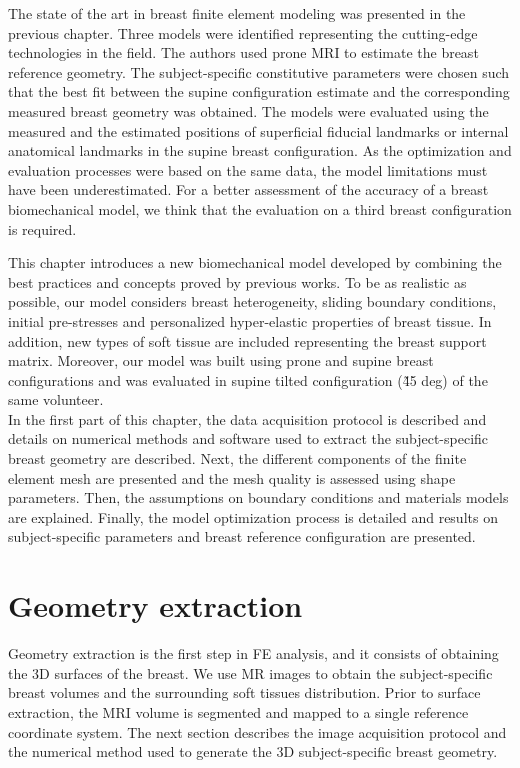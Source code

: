 
The state of the art in breast finite element modeling was presented in the previous chapter. Three models were identified representing the cutting-edge technologies in the field. The authors used prone MRI to estimate the breast reference geometry. The subject-specific constitutive parameters were chosen such that the best fit between the supine configuration estimate and the corresponding measured breast geometry was obtained. The models were evaluated using the measured and the estimated positions of superficial fiducial landmarks or internal anatomical landmarks in the supine breast configuration. As the optimization and evaluation  processes were based on the same data, the model limitations must have been underestimated. For a better assessment of the accuracy of a breast biomechanical model, we think that the evaluation on a third breast configuration is required.

 This chapter introduces a new biomechanical model developed by combining the best practices and concepts proved by previous works. To be as realistic as possible, our model considers breast heterogeneity, sliding boundary conditions, initial pre-stresses and personalized hyper-elastic properties of breast tissue. In addition, new types of soft tissue are included representing the breast support matrix. Moreover, our model was built using prone and supine breast configurations and was evaluated in supine tilted configuration (\~ 45 deg) of the same volunteer.\\
 

In the first part of this chapter, the data acquisition protocol is described and details on numerical methods and software used to extract the subject-specific breast geometry are described. Next, the different components of the finite element mesh are presented and the mesh quality is assessed using shape parameters.  Then, the assumptions on boundary conditions and materials models are explained. Finally, the model optimization process is detailed and results on subject-specific parameters and breast reference configuration are presented.   
\clearpage
\section{Geometry extraction}\label{section:geometryextraction}

Geometry extraction is the first step in FE analysis, and it consists of obtaining the 3D surfaces of the
breast. We use MR images to obtain the subject-specific breast volumes and the surrounding soft tissues distribution. Prior to surface extraction, the MRI volume is segmented and mapped to a single reference coordinate system. The next section describes the image acquisition protocol and the numerical method used to generate the 3D subject-specific breast geometry.


